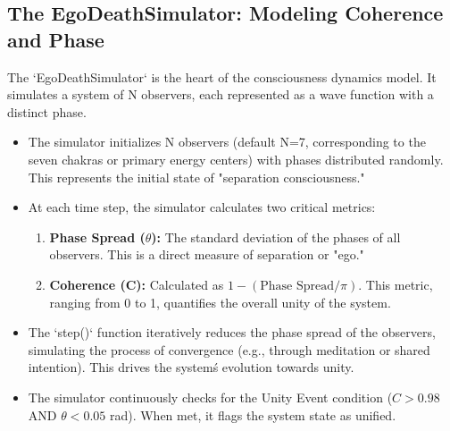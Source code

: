 \documentclass[twocolumn]{svjour3}
\begin{document}
\subsection{The EgoDeathSimulator: Modeling Coherence and Phase}
\label{sec:2.1}
The `EgoDeathSimulator` is the heart of the consciousness dynamics model. It simulates a system of N observers, each represented as a wave function with a distinct phase.
\begin{itemize}
    \item[\textbf{Initialization:}] The simulator initializes N observers (default N=7, corresponding to the seven chakras or primary energy centers) with phases distributed randomly. This represents the initial state of "separation consciousness."
    \item[\textbf{State Metrics:}] At each time step, the simulator calculates two critical metrics:
    \begin{enumerate}
        \item \textbf{Phase Spread ($\theta$):} The standard deviation of the phases of all observers. This is a direct measure of separation or "ego."
        \item \textbf{Coherence (C):} Calculated as $1 - (\text{Phase Spread} / \pi)$. This metric, ranging from 0 to 1, quantifies the overall unity of the system.
    \end{enumerate}
    \item[\textbf{Evolution:}] The `step()` function iteratively reduces the phase spread of the observers, simulating the process of convergence (e.g., through meditation or shared intention). This drives the system\'s evolution towards unity.
    \item[\textbf{Unity Event Trigger:}] The simulator continuously checks for the Unity Event condition ($C > 0.98$ AND $\theta < 0.05$ rad). When met, it flags the system state as unified.
\end{itemize}
\end{document}
